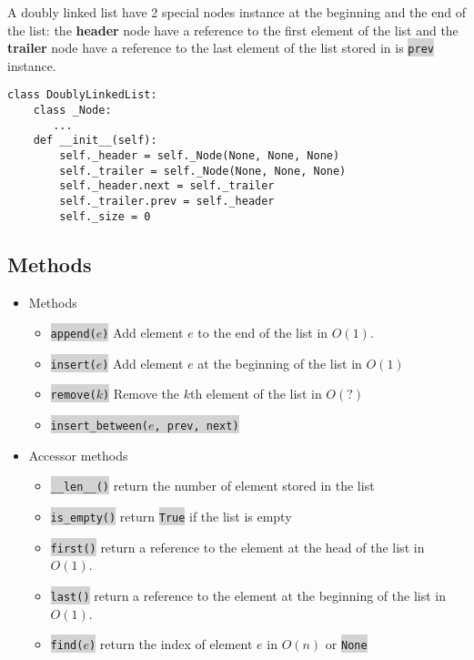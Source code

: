 \documentclass[10pt]{article}
\newcommand{\code}[1]{{\small\colorbox{LightGray}{\texttt{#1}}}}
\begin{document}
A doubly linked list have 2 special nodes instance at the beginning and the end of the list: the \textbf{header} node have a reference to the first element of the list and the \textbf{trailer} node have a reference to the last element of the list stored in is \code{prev} instance.

\begin{verbatim}
class DoublyLinkedList:
    class _Node:
       ...
    def __init__(self):
        self._header = self._Node(None, None, None)
        self._trailer = self._Node(None, None, None)
        self._header.next = self._trailer
        self._trailer.prev = self._header
        self._size = 0
\end{verbatim}

\subsection{Methods}
\begin{itemize}
	\item Methods
	\begin{itemize}
		\item[] \code{append($e$)} Add element $e$ to the end of the list in $O(1)$.
		\item[] \code{insert($e$)} Add element $e$ at the beginning of the list in $O(1)$
		\item[] \code{remove($k$)} Remove the $k$th element of the list in $O(?)$
		\item[] \code{insert\_between($e$, prev, next)}
	\end{itemize}
	\item Accessor methods
	\begin{itemize}
		\item[] \code{\_\_len\_\_()} return the number of element stored in the list
		\item[] \code{is\_empty()} return \code{True} if the list is empty
		\item[] \code{first()} return a reference to the element at the head of the list in $O(1)$.
		\item[] \code{last()} return a reference to the element at the beginning of the list in $O(1)$.
		\item[] \code{find($e$)} return the index of element $e$ in $O(n)$ or \code{None} 
	\end{itemize}		
\end{itemize}
\end{document}
